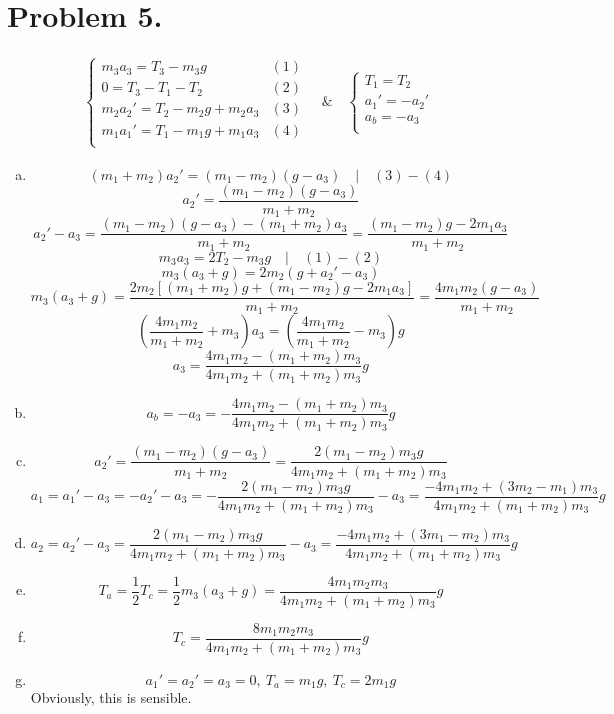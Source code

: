 \documentclass{article}
\begin{document}
\section*{Problem 5.}
	
	\begin{eqnarray*}
		\left\{
		\begin{array}{lcr}		
			m_3a_3=T_3-m_3g			& (1)\\
			0=T_3-T_1-T_2			& (2)\\
			m_2a_2'=T_2-m_2g+m_2a_3	& (3)\\
			m_1a_1'=T_1-m_1g+m_1a_3	& (4)\\
		\end{array}
		\right.\quad\&\quad
		\left\{
		\begin{array}{lcr}
			T_1=T_2\\
			a_1'=-a_2'\\
			a_b=-a_3\\
		\end{array}
		\right.
	\end{eqnarray*}
	\begin{enumerate}[(a)]
	\item
		$$(m_1+m_2)a_2'=(m_1-m_2)(g-a_3)\quad|\quad(3)-(4)$$
		$$a_2'=\frac{(m_1-m_2)(g-a_3)}{m_1+m_2}$$
		$$a_2'-a_3=\frac{(m_1-m_2)(g-a_3)-(m_1+m_2)a_3}{m_1+m_2}
		=\frac{(m_1-m_2)g-2m_1a_3}{m_1+m_2}$$
		$$m_3a_3=2T_2-m_3g\quad|\quad(1)-(2)$$
		$$m_3(a_3+g)=2m_2(g+a_2'-a_3)$$
		$$m_3(a_3+g)=\frac{2m_2[(m_1+m_2)g+(m_1-m_2)g-2m_1a_3]}{m_1+m_2}
		=\frac{4m_1m_2(g-a_3)}{m_1+m_2}$$
		$$\left(\frac{4m_1m_2}{m_1+m_2}+m_3\right)a_3=\left(\frac{4m_1m_2}{m_1+m_2}-m_3\right)g$$
		$$a_3=\frac{4m_1m_2-(m_1+m_2)m_3}{4m_1m_2+(m_1+m_2)m_3}g$$
	\item
		$$a_b=-a_3=-\frac{4m_1m_2-(m_1+m_2)m_3}{4m_1m_2+(m_1+m_2)m_3}g$$
	\item
		$$a_2'=\frac{(m_1-m_2)(g-a_3)}{m_1+m_2}
		=\frac{2(m_1-m_2)m_3g}{4m_1m_2+(m_1+m_2)m_3}$$
		$$a_1=a_1'-a_3=-a_2'-a_3=-\frac{2(m_1-m_2)m_3g}{4m_1m_2+(m_1+m_2)m_3}-a_3
		=\frac{-4m_1m_2+(3m_2-m_1)m_3}{4m_1m_2+(m_1+m_2)m_3}g$$
	\item
		$$a_2=a_2'-a_3=\frac{2(m_1-m_2)m_3g}{4m_1m_2+(m_1+m_2)m_3}-a_3
		=\frac{-4m_1m_2+(3m_1-m_2)m_3}{4m_1m_2+(m_1+m_2)m_3}g$$
	\item
		$$T_a=\frac{1}{2}T_c=\frac{1}{2}m_3(a_3+g)
		=\frac{4m_1m_2m_3}{4m_1m_2+(m_1+m_2)m_3}g$$	
	\item
		$$T_c=\frac{8m_1m_2m_3}{4m_1m_2+(m_1+m_2)m_3}g$$
	\item
		$$a_1'=a_2'=a_3=0,\ T_a=m_1g,\ T_c=2m_1g$$
		\center
		Obviously, this is sensible.
	\end{enumerate}
	
\end{document}
